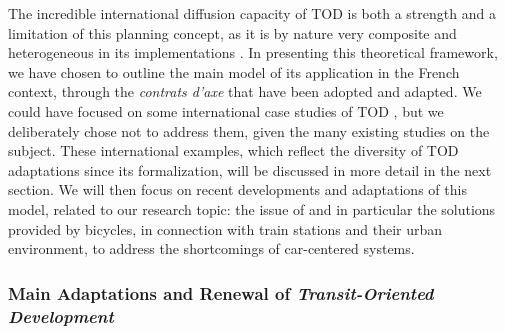 \begin{refsegment}
The incredible international diffusion capacity of \acrshort{TOD} is both a strength and a limitation of this planning concept, as it is by nature very composite and heterogeneous in its implementations \textcolor{blue}{\autocite[49]{bentayou_transit-oriented_2015}}. In presenting this theoretical framework, we have chosen to outline the main model of its application in the French context, through the \textsl{contrats d’axe} that have been adopted and adapted. We could have focused on some international case studies of \acrshort{TOD} \textcolor{blue}{\autocite[6]{knowles_transports_2020}}, but we deliberately chose not to address them, given the many existing studies on the subject. These international examples, which reflect the diversity of \acrshort{TOD} adaptations since its formalization, will be discussed in more detail in the next section. We will then focus on recent developments and adaptations of this model, related to our research topic: the issue of  and in particular the solutions provided by bicycles, in connection with train stations and their urban environment, to address the shortcomings of car-centered systems.%

\subsubsection*{Main Adaptations and Renewal of \textsl{Transit-Oriented Development}
    \label{chap1:tod-presentation-generale-declinaisons-hybrids}
    }


\end{refsegment}
